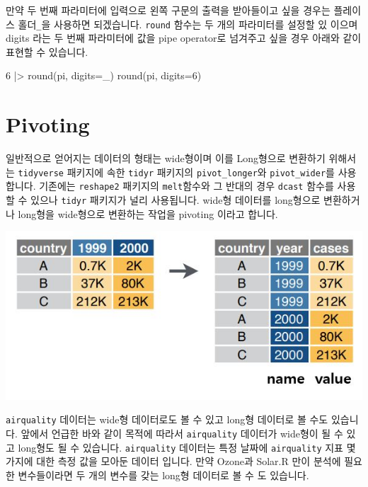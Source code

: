\documentclass[
  a4paper,
]{book}
\newenvironment{Shaded}{\begin{snugshade}}{\end{snugshade}}
\newcommand{\AttributeTok}[1]{\textcolor[rgb]{0.40,0.45,0.13}{#1}}
\newcommand{\DecValTok}[1]{\textcolor[rgb]{0.68,0.00,0.00}{#1}}
\newcommand{\FunctionTok}[1]{\textcolor[rgb]{0.28,0.35,0.67}{#1}}
\newcommand{\NormalTok}[1]{\textcolor[rgb]{0.00,0.23,0.31}{#1}}
\newcommand{\SpecialCharTok}[1]{\textcolor[rgb]{0.37,0.37,0.37}{#1}}
\begin{document}
만약 두 번째 파라미터에 입력으로 왼쪽 구문의 출력을 받아들이고 싶을
경우는 플레이스 홀더\texttt{\_}을 사용하면 되겠습니다. \texttt{round}
함수는 두 개의 파라미터를 설정할 있 이으며 digits 라는 두 번째
파라미터에 값을 pipe operator로 넘겨주고 싶을 경우 아래와 같이 표현할 수
있습니다.

\begin{Shaded}
\begin{Highlighting}[]
\DecValTok{6} \SpecialCharTok{|\textgreater{}} \FunctionTok{round}\NormalTok{(pi, }\AttributeTok{digits=}\NormalTok{\_)}
\FunctionTok{round}\NormalTok{(pi, }\AttributeTok{digits=}\DecValTok{6}\NormalTok{)}
\end{Highlighting}
\end{Shaded}

\hypertarget{pivoting}{%
\section{Pivoting}\label{pivoting}}

일반적으로 얻어지는 데이터의 형태는 wide형이며 이를 Long형으로 변환하기
위해서는 \texttt{tidyverse} 패키지에 속한 \texttt{tidyr} 패키지의
\texttt{pivot\_longer}와 \texttt{pivot\_wider}를 사용합니다. 기존에는
\texttt{reshape2} 패키지의 \texttt{melt}함수와 그 반대의 경우
\texttt{dcast} 함수를 사용할 수 있으나 \texttt{tidyr} 패키지가 널리
사용됩니다. wide형 데이터를 long형으로 변환하거나 long형을 wide형으로
변환하는 작업을 pivoting 이라고 합니다.

\includegraphics{images/07/wide2long.JPG}

\texttt{airquality} 데이터는 wide형 데이터로도 볼 수 있고 long형
데이터로 볼 수도 있습니다. 앞에서 언급한 바와 같이 목적에 따라서
\texttt{airquality} 데이터가 wide형이 될 수 있고 long형도 될 수
있습니다. \texttt{airquality} 데이터는 특정 날짜에 \texttt{airquality}
지표 몇 가지에 대한 측정 값을 모아둔 데이터 입니다. 만약 Ozone과 Solar.R
만이 분석에 필요한 변수들이라면 두 개의 변수를 갖는 long형 데이터로 볼
수 도 있습니다.
\end{document}
